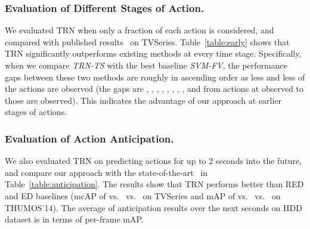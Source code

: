 \subsubsection{Evaluation of Different Stages of Action.}

We evaluated TRN when only a fraction of each action is
considered, and compared with published
results~\cite{de2016online} on TVSeries. Table~\ref{table:early}
shows that TRN significantly outperforms existing methods at every
time stage. Specifically, when we compare \textit{TRN-TS} with the
best baseline \textit{SVM-FV}, the performance gaps between these
two methods are roughly in ascending order as less and less of the
actions are observed
(the gaps are , , , , , ,
, ,  and  from actions at 
observed to those are  observed). This indicates the advantage of
our approach at earlier stages of actions.

\subsubsection{Evaluation of Action Anticipation.}

We also evaluated TRN on predicting actions for up to 2 seconds into
the future, and  compare our approach with the
state-of-the-art~\cite{gao2017red} in
Table~\ref{table:anticipation}. The results show that TRN
performs better than RED and ED baselines (mcAP of
 vs.~ vs.~ on TVSeries and mAP of 
vs.~ vs.~ on THUMOS'14). The average of anticipation
results over the next  seconds on HDD dataset is  in terms
of per-frame mAP.
